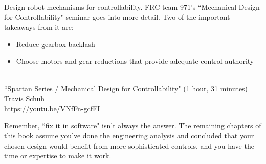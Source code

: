Design robot mechanisms for controllability. FRC team 971's ``Mechanical Design
for Controllability" seminar goes into more detail. Two of the important
takeaways from it are:
\begin{itemize}
  \item Reduce gearbox backlash
  \item Choose motors and gear reductions that provide adequate control
        authority
\end{itemize}
\begin{bookfigure}
   \\
  ``Spartan Series / Mechanical Design for Controllability" (1 hour, 31 minutes)
    \\
  \footnotesize Travis Schuh \\
  \url{https://youtu.be/VNfFn-gcfFI}
\end{bookfigure}

Remember, ``fix it in software" isn't always the answer. The remaining chapters
of this book assume you've done the engineering analysis and concluded that your
chosen design would benefit from more sophisticated controls, and you have the
time or expertise to make it work.
